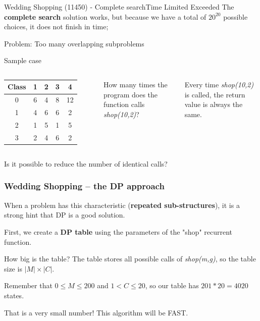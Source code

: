\begin{frame}{Wedding Shopping (11450) - Complete search}{Time Limited Exceeded}
  The {\bf complete search} solution works, but because we have a total of $20^{20}$ possible choices, it does not finish in time;\bigskip

  \alert{Problem: Too many overlapping subproblems}


  \begin{block}{Sample case}
    \medskip
    \begin{columns}[T]
      \begin{tabular}{|c|cccc|}
        Class & 1 & 2 & 3 & 4\\
        \hline
        0 & 6 & 4 & 8 & 12\\
        1 & 4 & 6 & 6 & 2\\
        2 & 1 & 5 & 1 & 5\\
        3 & 2 & 4 & 6 & 2\\
      \end{tabular}
      How many times the program does the function calls \emph{shop(10,2)}?\bigskip

      Every time \emph{shop(10,2)} is called, the return value is always the same.
    \end{columns}
  \end{block}
  Is it possible to reduce the number of identical calls?
\end{frame}


\begin{frame}
  \frametitle{Wedding Shopping -- the DP approach}

  When a problem has this characteristic ({\bf repeated sub-structures}), it is a strong hint that DP is a good solution.
  \bigskip

  First, we create a {\bf DP table} using the parameters of the "shop" recurrent function.

  \begin{block}{How big is the table?}
    The table stores all possible calls of \emph{shop(m,g)}, so the table size is $|M| \times |C|$.
    \bigskip

    Remember that $0 \leq M \leq 200$ and $1 < C \leq 20$, so our table has \alert{$201*20=4020$ states}.
  \end{block}
  \smallskip

  That is a very small number! This algorithm will be FAST.
\end{frame}

